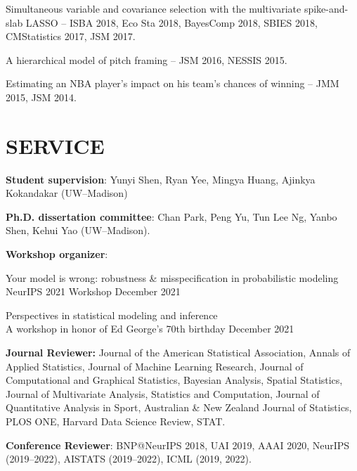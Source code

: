 \documentclass[margin]{res}
\begin{document}
\begin{resume}
Simultaneous variable and covariance selection with the multivariate spike-and-slab LASSO -- ISBA 2018, Eco Sta 2018, BayesComp 2018, SBIES 2018, CMStatistics 2017, JSM 2017.

A hierarchical model of pitch framing -- JSM 2016, NESSIS 2015.

Estimating an NBA player's impact on his team's chances of winning -- JMM 2015, JSM 2014.

\section{SERVICE}

\textbf{Student supervision}: Yunyi Shen, Ryan Yee, Mingya Huang, Ajinkya Kokandakar (UW--Madison)

\textbf{Ph.D. dissertation committee}: Chan Park, Peng Yu, Tun Lee Ng, Yanbo Shen, Kehui Yao (UW--Madison).

\textbf{Workshop organizer}: 

Your model is wrong: robustness \& misspecification in probabilistic modeling \\
NeurIPS 2021 Workshop \hfill December 2021

Perspectives in statistical modeling and inference \\
A workshop in honor of Ed George's 70th birthday \hfill December 2021


\textbf{Journal Reviewer:} Journal of the American Statistical Association, Annals of Applied Statistics, Journal of Machine Learning Research, Journal of Computational and Graphical Statistics, Bayesian Analysis, Spatial Statistics, Journal of Multivariate Analysis, Statistics and Computation, Journal of Quantitative Analysis in Sport, Australian \& New Zealand Journal of Statistics, PLOS ONE, Harvard Data Science Review, STAT. 

\textbf{Conference Reviewer}: BNP@NeurIPS 2018, UAI 2019, AAAI 2020,  NeurIPS (2019--2022), AISTATS (2019--2022), ICML (2019, 2022).
\end{resume} 
\end{document}
